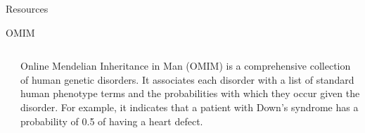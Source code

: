 \documentclass[final]{beamer} %
\begin{document}
\begin{frame}{}
\begin{columns}[T]
\begin{column}{0.3\linewidth}
\begin{block}{\Huge Resources}
    \begin{block}{\Large OMIM}
      \begin{columns}[T]
        \begin{column}{.5\textwidth}
		\centering
		\vspace{0.5cm}
        \end{column}
        
        \begin{column}{.5\textwidth}
        \Large
        Online Mendelian Inheritance in Man (OMIM) is a comprehensive collection of human genetic disorders. It associates each disorder with a list of standard human phenotype terms and the probabilities with which they occur given the disorder. For example, it indicates that a patient with Down's syndrome has a probability of 0.5 of having a heart defect.
       \end{column}
    \end{columns}
    \end{block}


\end{block}
\end{column}
\end{columns}
\end{frame}
\end{document}
